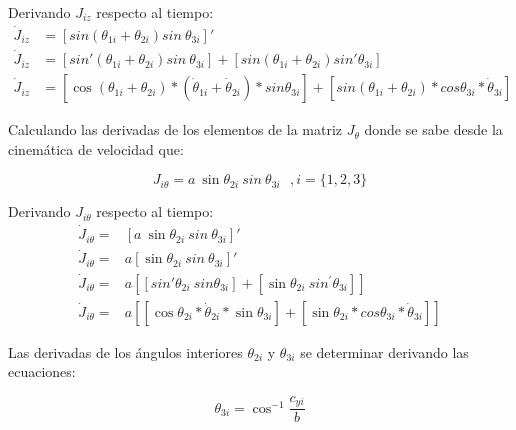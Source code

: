             Derivando   $J_{iz}$ respecto al tiempo:
            \begin{align*}
                 \dot{J}_{iz}&= \left[ sin \left(  \theta _{1i}+ \theta _{2i} \right) sin~ \theta _{3i} \right] '  \\
                 \dot{J}_{iz}&= \left[ sin' \left(  \theta _{1i}+ \theta _{2i} \right) sin~ \theta _{3i} \right] + \left[ sin \left(  \theta _{1i}+ \theta _{2i} \right) sin' \theta _{3i} \right]   \\
                 \dot{J}_{iz}&= \left[ \cos  \left(  \theta _{1i}+ \theta _{2i} \right) \ast \left( \dot{ \theta }_{1i}+\dot{ \theta }_{2i} \right) \ast sin  \theta _{3i} \right] + \left[ sin \left(  \theta _{1i}+ \theta _{2i} \right) \ast cos \theta _{3i}\ast\dot{ \theta }_{3i} \right]  
            \end{align*}
            
                                    \newpage

            Calculando las derivadas de los elementos de la matriz  $J_{ \theta }$ donde se sabe desde la cinemática de velocidad que:
            
            \begin{equation*}
             J_{i \theta }=a~\sin  \theta _{2i}~sin~ \theta _{3i}~~~,  i= \{ 1,2,3 \}   
            \end{equation*}

            Derivando  $J_{i \theta }$ respecto al tiempo:
            \begin{align*}
                 \dot{J}_{i \theta }=& \left[ a~\sin  \theta _{2i}~sin~ \theta _{3i} \right] ' \\
                 \dot{J}_{i \theta }=&a \left[ \sin  \theta _{2i}~sin~ \theta _{3i} \right] ' \\
                 \dot{J}_{i \theta }=&a \left[  \left[ sin' \theta _{2i}~sin⁡ \theta _{3i} \right] + \left[ \sin  \theta _{2i}~sin^{'} \theta _{3i} \right]  \right]  \\
                 \dot{J}_{i \theta }=&a \left[  \left[ \cos  \theta _{2i}\ast\dot{ \theta }_{2i}\ast \sin  \theta _{3i} \right] + \left[ \sin  \theta _{2i}\ast cos \theta _{3i}\ast\dot{ \theta }_{3i} \right]  \right]
            \end{align*}

            Las derivadas de los ángulos interiores  $\theta _{2i}$ y  $\theta _{3i}$ se determinar derivando las ecuaciones:
        
            \begin{equation*}
              \theta _{3i}= \cos ^{-1}\frac{c_{yi}}{b} 
            \end{equation*}


